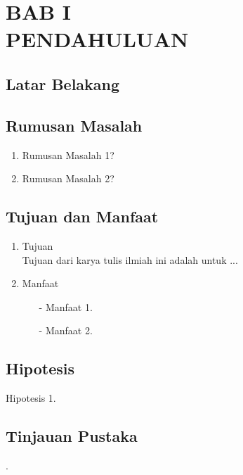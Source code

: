 \section*{\centering BAB I\\ PENDAHULUAN}
\setcounter{section}{1}

\subsection{Latar Belakang}

\lipsum[2]

\lipsum[3]

\subsection{Rumusan Masalah}

\begin{enumerate}[label = \alph*.]
    \item Rumusan Masalah 1?
    \item Rumusan Masalah 2?
\end{enumerate}
\subsection{Tujuan dan Manfaat}

\begin{enumerate}[label = \alph*.]
    \item Tujuan\\
    Tujuan dari karya tulis ilmiah ini adalah untuk ...
    \item Manfaat
    \begin{itemize}
        \item[-] Manfaat 1.
        \item[-] Manfaat 2.
    \end{itemize}
\end{enumerate}
\subsection{Hipotesis}
   Hipotesis 1.
   
\subsection{Tinjauan Pustaka}

\lipsum[5] \cite{pml}

\lipsum[6] \cite{smb}.

\lipsum[7] \cite{lcr} 

\lipsum[8] \cite{tpm}

